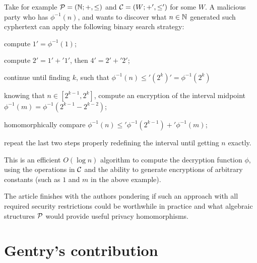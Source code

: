Take for example $\mathcal P = (\mathbb{N};+,\leq)$ and $\mathcal C = (W;+',\leq')$ for some $W$. A malicious party who has $\phi^{-1}(n)$, and wants to discover what $n\in\mathbb{N}$ generated such cyphertext can apply the following binary search strategy:
\begin{alineas}
\item compute $1'=\phi^{-1}(1)$;
\item compute $2'=1'+'1'$, then $4'=2'+'2'$;
\item continue until finding $k$, such that $\phi^{-1}(n)\leq'(2^k)'=\phi^{-1}(2^k)$
\item knowing that $n\in[2^{k-1},2^{k}]$, compute an encryption of the interval midpoint $\phi^{-1}(m)=\phi^{-1}(2^{k-1}-2^{k-2})$;
\item homomorphically compare $\phi^{-1}(n)\leq'\phi^{-1}(2^{k-1})+'\phi^{-1}(m)$;
\item repeat the last two steps properly redefining the interval until getting $n$ exactly.
\end{alineas}
This is an efficient $O(\log n)$ algorithm to compute the decryption function $\phi$, using the operations in $\mathcal C$ and the ability to generate encryptions of arbitrary constants (such as $1$ and $m$ in the above example).

The article finishes with the authors pondering if such an approach with all required security restrictions could be worthwhile in practice and what algebraic structures $\mathcal P$ would provide useful privacy homomorphisms.

\section{Gentry's contribution}
\label{sec:gentry}



